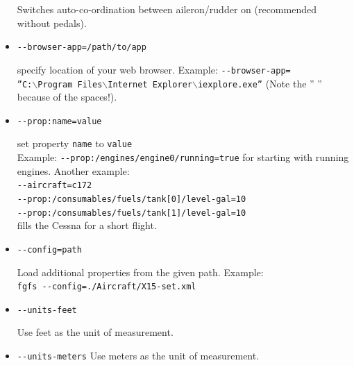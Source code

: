 \begin{itemize}
  Switches auto-co-ordination between aileron/rudder on (recommended
  without pedals).

\item{\texttt{-$ $-browser-app=/path/to/app}}

  specify location of your web browser. Example:
  \texttt{-$ $-browser-app=}\\
  \texttt{''C:$\backslash$Program~Files$\backslash$Internet~Explorer$\backslash$iexplore.exe''}
  (Note the '' '' because of the spaces!).

\item{\texttt{-$ $-prop:name=value}}

  set property \texttt{name} to \texttt{value}\\Example:
\texttt{-$ $-prop:/engines/engine0/running=true} for starting with running engines. Another example:\\
\texttt{-$ $-aircraft=c172}\\
\texttt{-$ $-prop:/consumables/fuels/tank[0]/level-gal=10}\\
\texttt{-$ $-prop:/consumables/fuels/tank[1]/level-gal=10}\\
fills the Cessna for a short flight.

\item{\texttt{-$ $-config=path}}

  Load additional properties from the given path. Example:\\
  \texttt{fgfs -$ $-config=./Aircraft/X15-set.xml}

\item{\texttt{-$ $-units-feet}}

  Use feet as the unit of measurement.

\item{\texttt{-$ $-units-meters}}
  Use meters as the unit of measurement.
\end{itemize}
